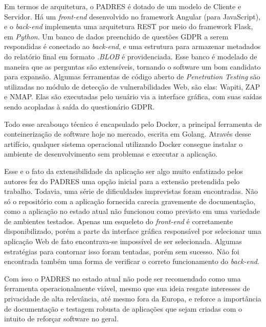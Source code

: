Em termos de arquitetura, o PADRES é dotado de um modelo de Cliente e Servidor. Há um \textit{front-end} desenvolvido no framework Angular (para JavaScript), e o \textit{back-end} implementa uma arquitetura REST por meio do framework Flask, em \textit{Python}. Um banco de dados preenchido de questões GDPR a serem respondidas é conectado ao \textit{back-end}, e uma estrutura para armazenar metadados do relatório final em formato \textit{.BLOB} é providenciada. Esse banco é modelado de maneira que as perguntas são extensíveis, tornando o software um bom candidato para expansão. Algumas ferramentas de código aberto de \textit{Penetration Testing} são utilizadas no módulo de detecção de vulnerabilidades Web, são elas: Wapiti, ZAP e NMAP. Elas são executadas pelo usuário via a interface gráfica, com suas saídas sendo acopladas à saída do questionário GDPR.

Todo esse arcabouço técnico é encapsulado pelo Docker, a principal ferramenta de conteinerização de software hoje no mercado, escrita em Golang. Através desse artifício, qualquer sistema operacional utilizando Docker consegue instalar o ambiente de desenvolvimento sem problemas e executar a aplicação.

Esse e o fato da extensibilidade da aplicação ser algo muito enfatizado pelos autores fez do PADRES uma opção inicial para a extensão pretendida pelo trabalho. Todavia, uma série de dificuldades imprevistas foram encontradas. Não só o repositório com a aplicação fornecida carecia gravemente de documentação, como a aplicação no estado atual não funcionou como previsto em uma variedade de ambientes testados. Apenas um esqueleto do \textit{front-end} é corretamente disponibilizado, porém a parte da interface gráfica responsável por selecionar uma aplicação Web de fato encontrava-se impossível de ser selecionada. Algumas estratégias para contornar isso foram tentadas, porém sem sucesso. Não foi encontrada também uma forma de verificar o correto funcionamento do \textit{back-end}.

Com isso o PADRES no estado atual não pode ser recomendado como uma ferramenta operacionalmente viável, mesmo que sua ideia resgate interesses de privacidade de alta relevância, até mesmo fora da Europa, e reforce a importância de documentação e testagem robusta de aplicações que sejam criadas com o intuito de reforçar software no geral. 

